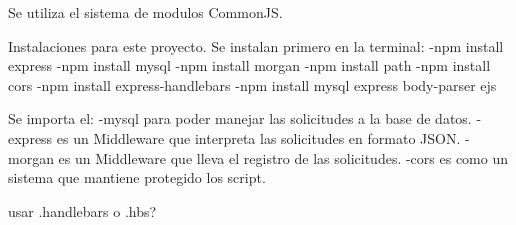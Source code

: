 Se utiliza el sistema de modulos CommonJS.

Instalaciones para este proyecto.
Se instalan primero en la terminal:
-npm install express
-npm install mysql
-npm install morgan
-npm install path 
-npm install cors
-npm install express-handlebars
-npm install mysql express body-parser ejs

Se importa el:
-mysql para poder manejar las solicitudes a la base de datos.
-express es un Middleware que interpreta las solicitudes en formato JSON.
-morgan es un Middleware que lleva el registro de las solicitudes.
-cors es como un sistema que mantiene protegido los script.


usar .handlebars o .hbs?